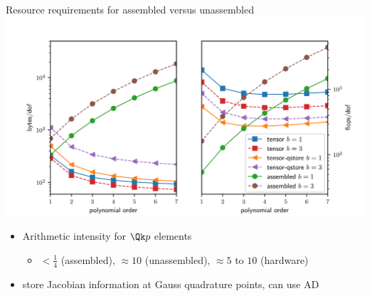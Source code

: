 \begin{frame}[shrink=5]{Resource requirements for assembled versus unassembled}
  \vspace{1ex}
  \includegraphics[width=\textwidth]{figures/TensorVsAssembly-qstore} \\
  \begin{itemize}
  \item Arithmetic intensity for $\Qk p$ elements
    \begin{itemize}
    \item $< \frac 1 4$ (assembled), $\approx 10$ (unassembled), $\approx 5$ to $10$ (hardware)
    \end{itemize}
  \item store Jacobian information at Gauss quadrature points, can use AD
  \end{itemize}
\end{frame}
